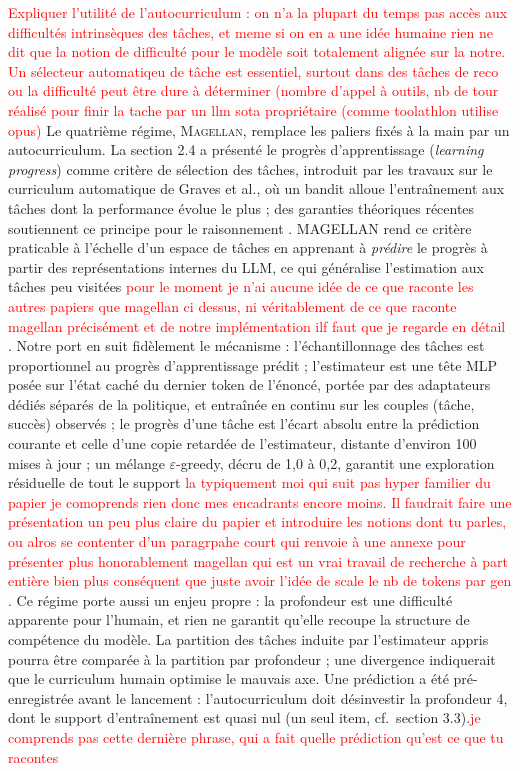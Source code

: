 \documentclass[11pt,a4paper]{article}
\begin{document}
\textcolor{red}{Expliquer l'utilité de l'autocurriculum : on n'a la plupart du temps pas accès aux difficultés intrinsèques des tâches, et meme si on en a une idée humaine rien ne dit que la notion de difficulté pour le modèle soit totalement alignée sur la notre. Un sélecteur automatiqeu de tâche est essentiel, surtout dans des tâches de reco ou la difficulté peut être dure à déterminer (nombre d'appel à outils, nb de tour réalisé pour finir la tache par un llm sota propriétaire (comme toolathlon utilise opus)} 
Le quatrième régime, \textsc{Magellan}, remplace les paliers fixés à la main par un autocurriculum. La section 2.4 a présenté le progrès d'apprentissage (\emph{learning progress}) comme critère de sélection des tâches, introduit par les travaux sur le curriculum automatique de Graves et al., où un bandit alloue l'entraînement aux tâches dont la performance évolue le plus \cite{graves2017automated} ; des garanties théoriques récentes soutiennent ce principe pour le raisonnement \cite{rajaraman2026curriculum}. MAGELLAN rend ce critère praticable à l'échelle d'un espace de tâches en apprenant à \emph{prédire} le progrès à partir des représentations internes du LLM, ce qui généralise l'estimation aux tâches peu visitées \cite{gaven2025magellan} \textcolor{red}{pour le moment je n'ai aucune idée de ce que raconte les autres papiers que magellan ci dessus, ni véritablement de ce que raconte magellan précisément et de notre implémentation ilf faut que je regarde en détail} . Notre port en suit fidèlement le mécanisme : l'échantillonnage des tâches est proportionnel au progrès d'apprentissage prédit ; l'estimateur est une tête MLP posée sur l'état caché du dernier token de l'énoncé, portée par des adaptateurs dédiés séparés de la politique, et entraînée en continu sur les couples (tâche, succès) observés ; le progrès d'une tâche est l'écart absolu entre la prédiction courante et celle d'une copie retardée de l'estimateur, distante d'environ 100 mises à jour ; un mélange $\varepsilon$-greedy, décru de 1{,}0 à 0{,}2, garantit une exploration résiduelle de tout le support \textcolor{red}{la typiquement moi qui suit pas hyper familier du papier je comoprends rien donc mes encadrants encore moins. Il faudrait faire une présentation un peu plus claire du papier et introduire les notions dont tu parles, ou alros se contenter d'un paragrpahe court qui renvoie à une annexe pour présenter plus honorablement magellan qui est un vrai travail de recherche à part entière bien plus conséquent que juste avoir l'idée de scale le nb de tokens par gen} . Ce régime porte aussi un enjeu propre : la profondeur est une difficulté apparente pour l'humain, et rien ne garantit qu'elle recoupe la structure de compétence du modèle. La partition des tâches induite par l'estimateur appris pourra être comparée à la partition par profondeur ; une divergence indiquerait que le curriculum humain optimise le mauvais axe. Une prédiction a été pré-enregistrée avant le lancement : l'autocurriculum doit désinvestir la profondeur 4, dont le support d'entraînement est quasi nul (un seul item, cf.~section 3.3).\textcolor{red}{je comprends pas cette dernière phrase, qui a fait quelle prédiction qu'est ce que tu racontes} 
\end{document}
